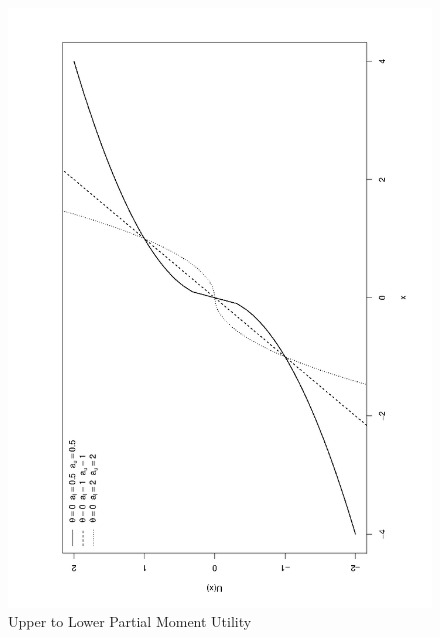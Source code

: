 \begin{figure}
\centering
\includegraphics[scale=0.5,angle=-90,width=15cm]{lpmutility.png}
\caption[Upper to Lower Partial Moment Utility]{Upper to Lower Partial Moment Utility}\label{fig:lpmutility}
\end{figure} 